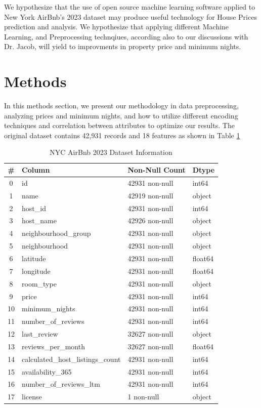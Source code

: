 \documentclass[a4paper,12pt]{article}
\begin{document}
We hypothesize that the use of open source machine learning software applied to New York AirBnb's 2023 dataset may produce useful technology for House Prices prediction and analysis. We hypothesize that applying different Machine Learning, and Preprocessing technqiues, according also to our discussions with Dr. Jacob, will yield to improvments in property price and minimum nights.

\section*{Methods}

In this methods section, we present our methodology in data preprocessing,
analyzing prices and minimum nights, and how to utilize different encoding techniques and correlation between attributes to optimize our results.
The original dataset contains 42,931 records and 18 features as shown in Table \ref{tab:dataframe_overview}

\begin{table}[h!]
\centering
\begin{tabular}{|c|l|l|l|}
\hline
\textbf{\#} & \textbf{Column} & \textbf{Non-Null Count} & \textbf{Dtype} \\ \hline
0 & id & 42931 non-null & int64 \\ \hline
1 & name & 42919 non-null & object \\ \hline
2 & host\_id & 42931 non-null & int64 \\ \hline
3 & host\_name & 42926 non-null & object \\ \hline
4 & neighbourhood\_group & 42931 non-null & object \\ \hline
5 & neighbourhood & 42931 non-null & object \\ \hline
6 & latitude & 42931 non-null & float64 \\ \hline
7 & longitude & 42931 non-null & float64 \\ \hline
8 & room\_type & 42931 non-null & object \\ \hline
9 & price & 42931 non-null & int64 \\ \hline
10 & minimum\_nights & 42931 non-null & int64 \\ \hline
11 & number\_of\_reviews & 42931 non-null & int64 \\ \hline
12 & last\_review & 32627 non-null & object \\ \hline
13 & reviews\_per\_month & 32627 non-null & float64 \\ \hline
14 & calculated\_host\_listings\_count & 42931 non-null & int64 \\ \hline
15 & availability\_365 & 42931 non-null & int64 \\ \hline
16 & number\_of\_reviews\_ltm & 42931 non-null & int64 \\ \hline
17 & license & 1 non-null & object \\ \hline
\end{tabular}
\caption{NYC AirBnb 2023 Dataset Information}
\label{tab:dataframe_overview}
\end{table}
\end{document}

